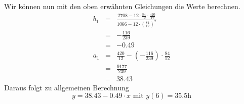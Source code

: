 Wir können nun mit den oben erwähnten Gleichungen die Werte berechnen.
\begin{equation*}
\begin{array}{rcl}
b_1 &=& \frac{2708-12\cdot \frac{84}{12}\cdot \frac{420}{12}}{1066-12\cdot\left(\frac{84}{12}\right)^2} \\
&=& -\frac{116}{239} \\
&=& -0.49\\
a_1 &=&\frac{420}{12}-(-\frac{116}{239})\cdot \frac{84}{12} \\
&=& \frac{9177}{239} \\
&=& 38.43 
\end{array}
\end{equation*}
Daraus folgt zu allgemeinen Berechnung
\begin{equation*}
y=38.43 - 0.49 \cdot x \text{ mit } y(6) = 35.5\text{h}
\end{equation*}